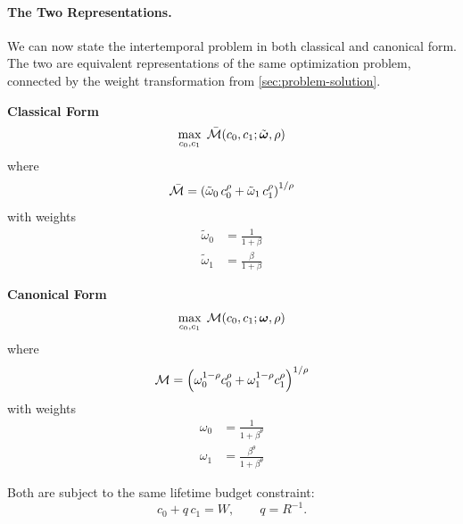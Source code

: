 \paragraph{The Two Representations.}
We can now state the intertemporal problem in both classical and canonical form. The two are equivalent representations of the same optimization problem, connected by the weight transformation from \cref{sec:problem-solution}.

\medskip
\noindent
\begin{minipage}[t]{0.48\textwidth}
\centering\textbf{Classical Form}
\begin{equation}
\max_{c_0, c_1} \; \bar{\mathcal{M}}(c_0, c_1; \tilde{\boldsymbol{\omega}}, \rho)
\label{eq:classical-obj-inter}
\end{equation}
where
\begin{equation}
\bar{\mathcal{M}} = \left( \tilde{\omega}_0 \, c_0^{\rho} + \tilde{\omega}_1 \, c_1^{\rho} \right)^{1/\rho}
\label{eq:classical-mean-inter}
\end{equation}
with weights
\begin{align}
\tilde{\omega}_0 &= \frac{1}{1+\beta} \label{eq:classical-w0} \\[4pt]
\tilde{\omega}_1 &= \frac{\beta}{1+\beta} \label{eq:classical-w1}
\end{align}
\end{minipage}%
\hfill
\begin{minipage}[t]{0.48\textwidth}
\centering\textbf{Canonical Form}
\begin{equation}
\max_{c_0, c_1} \; \mathcal{M}(c_0, c_1; \boldsymbol{\omega}, \rho)
\label{eq:canonical-obj-inter}
\end{equation}
where
\begin{equation}
\mathcal{M} = \left( \omega_0^{1-\rho} c_0^{\rho} + \omega_1^{1-\rho} c_1^{\rho} \right)^{1/\rho}
\label{eq:canonical-mean-inter}
\end{equation}
with weights
\begin{align}
\omega_0 &= \frac{1}{1+\beta^{\theta}} \label{eq:canonical-w0} \\[4pt]
\omega_1 &= \frac{\beta^{\theta}}{1+\beta^{\theta}} \label{eq:canonical-w1}
\end{align}
\end{minipage}

\medskip
\noindent
Both are subject to the same lifetime budget constraint:
\begin{equation}
c_0 + q \, c_1 = W, \qquad q = R^{-1}.
\label{eq:budget-both}
\end{equation}

